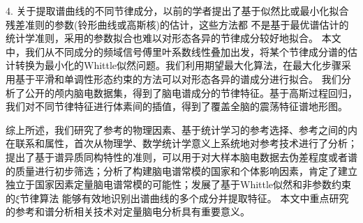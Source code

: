 \begin{chineseabstract}
4. 关于提取谱曲线的不同节律成分，以前的学者提出了基于似然比或最小化拟合残差准则的参数(铃形曲线或高斯核)的估计，这些方法都
不是基于最优谱估计的统计学准则，采用的参数拟合也难以对形态各异的节律成分较好地拟合。 本文中，我们从不同成分的频域信号傅里叶系数线性叠加出发，将某个节律成分谱的估计转换为最小化的Whittle似然问题。我们利用期望最大化算法，在最大化步骤采用基于平滑和单调性形态约束的方法可以对形态各异的谱成分进行拟合。 我们分析了公开的颅内脑电数据集，得到了脑电谱成分的节律特征。基于高斯过程回归，我们对不同节律特征进行体素间的插值，得到了覆盖全脑的震荡特征谱地形图。 

综上所述，我们研究了参考的物理因素、基于统计学习的参考选择、参考之间的内在联系和属性，首次从物理学、数学统计学意义上系统地对参考技术进行了分析；提出了基于谱异质同构特性的准则，可以用于对大样本脑电数据去伪差程度或者谱的质量进行初步筛选；分析了构建脑电谱常模的国家和个体影响因素，肯定了建立独立于国家因素定量脑电谱常模的可能性；发展了基于Whittle似然和非参数约束的$\xi$节律算法
能够有效地识别出谱曲线的多个成分并提取特征。 本文中重点研究的参考和谱分析相关技术对定量脑电分析具有重要意义。

\end{chineseabstract}